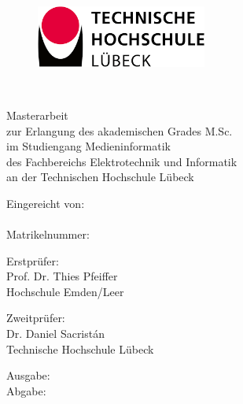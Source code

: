 \begin{titlepage}

\begin{center}

\begin{figure}[tbh]
 \centering
 \includegraphics[width=0.5\textwidth]{images/th-logo.png}
\end{figure}

\vspace{1.cm}

{
 \fontsize{20}{28}\selectfont
 \myTitle\\[0.5cm]
}

\fontsize{12}{12}\selectfont

\vspace{1.cm}

Masterarbeit\\
zur Erlangung des akademischen Grades M.Sc.\\
im Studiengang Medieninformatik\\
des Fachbereichs Elektrotechnik und Informatik\\
an der Technischen Hochschule Lübeck

\vspace{0.5cm}

Eingereicht von:\\
\myAuthor\\
Matrikelnummer: \myMatrikelnummer

\vspace{0.5cm}

Erstprüfer:\\
Prof. Dr. Thies Pfeiffer\\
Hochschule Emden/Leer\\


\vspace{.3cm}

Zweitprüfer:\\
Dr. Daniel Sacristán\\
Technische Hochschule Lübeck\\


\vspace{0.5cm}

Ausgabe: \startDate\\
Abgabe: \myDate

\end{center}
\end{titlepage}
